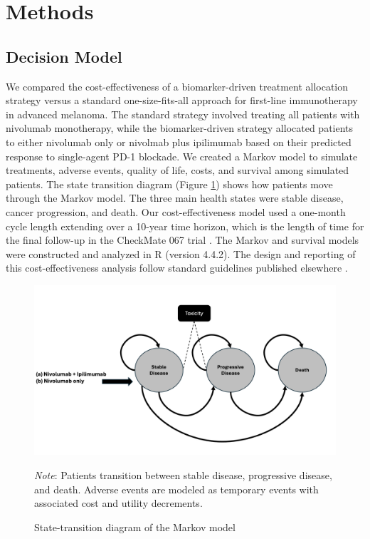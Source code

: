 \documentclass[preprint, 3p,
authoryear]{elsarticle} %
\begin{document}
\section{Methods}\label{methods}

\subsection{Decision Model}\label{decision-model}

We compared the cost-effectiveness of a biomarker-driven treatment
allocation strategy versus a standard one-size-fits-all approach for
first-line immunotherapy in advanced melanoma. The standard strategy
involved treating all patients with nivolumab monotherapy, while the
biomarker-driven strategy allocated patients to either nivolumab only or
nivolmab plus ipilimumab based on their predicted response to
single-agent PD-1 blockade. We created a Markov model to simulate
treatments, adverse events, quality of life, costs, and survival among
simulated patients. The state transition diagram (Figure
\hyperref[fig:model]{\ref{fig:model}}) shows how patients move through
the Markov model. The three main health states were stable disease,
cancer progression, and death. Our cost-effectiveness model used a
one-month cycle length extending over a 10-year time horizon, which is
the length of time for the final follow-up in the CheckMate 067 trial
\citep{checkmate067}. The Markov and survival models were constructed
and analyzed in R (version 4.4.2). The design and reporting of this
cost-effectiveness analysis follow standard guidelines published
elsewhere \citep{Sanders2016}.

\begin{figure}[h]
\centering
\includegraphics[width=\textwidth]{../outputs/model.png}
\caption{State-transition diagram of the Markov model}
\label{fig:model}
\begin{tablenotes}
\footnotesize
\item \textit{Note}: Patients transition between stable disease, progressive disease, and death. Adverse events are modeled as temporary events with associated cost and utility decrements.
\end{tablenotes}
\end{figure}
\end{document}
